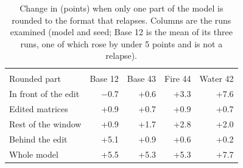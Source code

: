 \begin{table}[!t]
\centering\footnotesize\setlength{\tabcolsep}{2.5pt}
\begin{tabular}{@{}lrrrr@{}}
\toprule
 & \multicolumn{2}{c}{\fq{}} & \multicolumn{2}{c}{\nf{}} \\
Rounded part & Base 12 & Base 43 & Fire 44 & Water 42 \\
\midrule
In front of the edit & $-$0.7 & +0.6 & +3.3 & +7.6 \\
Edited matrices & +0.9 & +0.7 & +0.9 & +0.7 \\
Rest of the window & +0.9 & +1.7 & +2.8 & +2.0 \\
Behind the edit & +5.1 & +0.9 & +0.6 & +0.2 \\
Whole model & +5.5 & +5.3 & +5.3 & +7.7 \\
\bottomrule
\end{tabular}
\caption{Change in \wmdp{} (points) when only one part of the model is rounded to the format that relapses. Columns are the runs examined (model and seed; Base 12 is the mean of its three runs, one of which rose by under 5 points and is not a relapse).}
\label{tab:cause}
\end{table}
